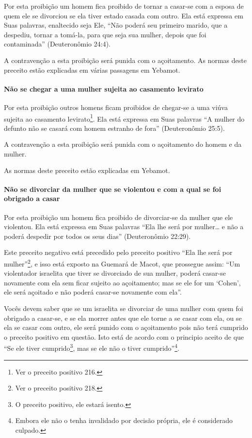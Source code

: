 Por esta proibição um homem fica proibido de tornar a casar-se com a
esposa de quem ele se divorciou se ela tiver estado casada com outro.
Ela está expressa em Suas palavras, enaltecido seja Ele, ``Não poderá
seu primeiro marido, que a despediu, tornar a tomá-la, para que seja sua
mulher, depois que foi contaminada'' (Deuteronômio 24:4).

A contravenção a esta proibição será punida com o açoitamento. As normas
deste preceito estão explicadas em várias passagens em Yebamot.

\paragraph{Não se chegar a uma mulher sujeita ao casamento levirato}

Por esta proibição outros homens ficam proibidos de chegar-se a uma
viúva sujeita ao casamento levirato\footnote{Ver o preceito positivo 216.}. Ela está
expressa em Suas palavras ``A mulher do defunto não se casará com homem
estranho de fora'' (Deuteronômio 25:5).

A contravenção a esta proibição será punida com o açoitamento do homem e
da mulher.

As normas deste preceito estão explicadas em Yebamot.

\paragraph{Não se divorciar da mulher que se violentou e com a qual se foi obrigado a casar}

Por esta proibição um homem fica proibido de divorciar-se da mulher que
ele violentou. Ela está expressa em Suas palavras ``Ela lhe será por
mulher\ldots{} e não a poderá despedir por todos os seus dias''
(Deuteronômio 22:29).

Este preceito negativo está precedido pelo preceito positivo ``Ela lhe
será por mulher''\footnote{Ver o preceito positivo 218.}, e isso está exposto na Guemará
de Macot, que prossegue assim: ``Um violentador israelita que tiver se
divorciado de sua mulher, poderá casar-se novamente com ela sem ficar
sujeito ao açoitamento; mas se ele for um `Cohen', ele será açoitado e
não poderá casar-se novamente com ela''.

Vocês devem saber que se um israelita se divorciar de uma mulher com
quem foi obrigado a casar-se, e se ela morrer antes que ele torne a se
casar com ela, ou se ela se casar com outro, ele será punido com o
açoitamento pois não terá cumprido o preceito positivo em questão. Isto
está de acordo com o principio aceito de que ``Se ele tiver
cumprido\footnote{O preceito positivo, ele estará isento.}, mas se ele não o tiver
cumprido''\footnote{Embora ele não o tenha invalidado por decisão própria, ele é
  considerado culpado.}.

